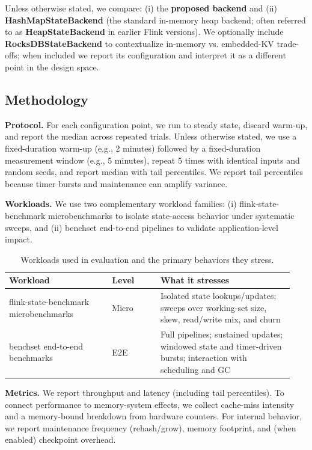 \documentclass[sigconf]{acmart}
\begin{document}
Unless otherwise stated, we compare: (i) the \textbf{proposed backend} and (ii) \textbf{HashMapStateBackend} (the standard in-memory heap backend; often referred to as \textbf{HeapStateBackend} in earlier Flink versions).
We optionally include \textbf{RocksDBStateBackend} to contextualize in-memory vs. embedded-KV trade-offs; when included we report its configuration and interpret it as a different point in the design space.

\subsection{Methodology}
\label{sec:eval-methodology}
\textbf{Protocol.} For each configuration point, we run to steady state, discard warm-up, and report the median across repeated trials. Unless otherwise stated, we use a fixed-duration warm-up (e.g., 2 minutes) followed by a fixed-duration measurement window (e.g., 5 minutes), repeat 5 times with identical inputs and random seeds, and report median with tail percentiles. We report tail percentiles because timer bursts and maintenance can amplify variance.

\textbf{Workloads.} We use two complementary workload families: (i) flink-state-benchmark microbenchmarks to isolate state-access behavior under systematic sweeps, and (ii) benchset end-to-end pipelines to validate application-level impact.

\begin{table}[t]
  \caption{Workloads used in evaluation and the primary behaviors they stress.}
  \label{tab:workloads}
  \centering
  \begin{tabular}{p{0.34\linewidth}p{0.16\linewidth}p{0.44\linewidth}}
    \toprule
    \textbf{Workload} & \textbf{Level} & \textbf{What it stresses} \\
    \midrule
    flink-state-benchmark microbenchmarks & Micro & Isolated state lookups/updates; sweeps over working-set size, skew, read/write mix, and churn \\
    benchset end-to-end benchmarks & E2E & Full pipelines; sustained updates; windowed state and timer-driven bursts; interaction with scheduling and GC \\
    \bottomrule
  \end{tabular}
\end{table}

\textbf{Metrics.} We report throughput and latency (including tail percentiles).
To connect performance to memory-system effects, we collect cache-miss intensity and a memory-bound breakdown from hardware counters.
For internal behavior, we report maintenance frequency (rehash/grow), memory footprint, and (when enabled) checkpoint overhead.
\end{document}
